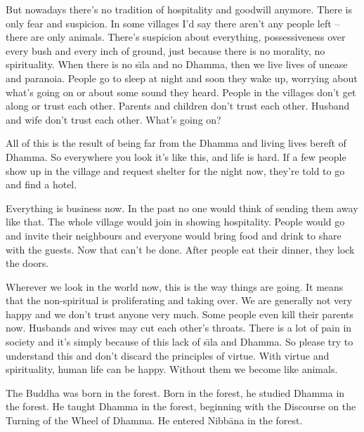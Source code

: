 But nowadays there's no tradition of hospitality and goodwill anymore. There is only fear and suspicion. In some villages I'd say there aren't any people left -- there are only animals. There's suspicion about everything, possessiveness over every bush and every inch of ground, just because there is no morality, no spirituality. When there is no s\={\i}la and no Dhamma, then we live lives of unease and paranoia. People go to sleep at night and soon they wake up, worrying about what's going on or about some sound they heard. People in the villages don't get along or trust each other. Parents and children don't trust each other. Husband and wife don't trust each other. What's going on?

All of this is the result of being far from the Dhamma and living lives bereft of Dhamma. So everywhere you look it's like this, and life is hard. If a few people show up in the village and request shelter for the night now, they're told to go and find a hotel.

Everything is business now. In the past no one would think of sending them away like that. The whole village would join in showing hospitality. People would go and invite their neighbours and everyone would bring food and drink to share with the guests. Now that can't be done. After people eat their dinner, they lock the doors.

Wherever we look in the world now, this is the way things are going. It means that the non-spiritual is proliferating and taking over. We are generally not very happy and we don't trust anyone very much. Some people even kill their parents now. Husbands and wives may cut each other's throats. There is a lot of pain in society and it's simply because of this lack of s\={\i}la and Dhamma. So please try to understand this and don't discard the principles of virtue. With virtue and spirituality, human life can be happy. Without them we become like animals.

The Buddha was born in the forest. Born in the forest, he studied Dhamma in the forest. He taught Dhamma in the forest, beginning with the Discourse on the Turning of the Wheel of Dhamma. He entered Nibb\=ana in the forest.

